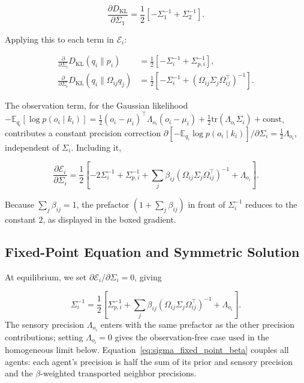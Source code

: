 \begin{equation}
\frac{\partial D_{\mathrm{KL}}}{\partial \Sigma_1}
=\frac{1}{2}\left[
-\Sigma_1^{-1}
+ \Sigma_2^{-1}
\right].
\end{equation}

Applying this to each term in $\mathcal{E}_i$:

\begin{align}
\frac{\partial}{\partial \Sigma_i}
D_{\mathrm{KL}}(q_i \| p_i)
&=\frac{1}{2}\left[
-\Sigma_i^{-1}
+ \Sigma_{p,i}^{-1}
\right],
\\[6pt]
\frac{\partial}{\partial \Sigma_i}
D_{\mathrm{KL}}(q_i \| \Omega_{ij} q_j)
&=
\frac{1}{2}\left[
-\Sigma_i^{-1}
+ (\Omega_{ij}\Sigma_j\Omega_{ij}^\top)^{-1}
\right].
\end{align}

The observation term, for the Gaussian likelihood $-\mathbb{E}_{q_i}[\log p(o_i \mid k_i)] = \tfrac{1}{2}(o_i - \mu_i)^\top \Lambda_{o_i}(o_i - \mu_i) + \tfrac{1}{2}\mathrm{tr}(\Lambda_{o_i}\Sigma_i) + \mathrm{const}$, contributes a constant precision correction $\partial[-\mathbb{E}_{q_i}\log p(o_i \mid k_i)]/\partial\Sigma_i = \tfrac{1}{2}\Lambda_{o_i}$, independent of $\Sigma_i$. Including it,

\begin{equation}
\boxed{
\frac{\partial \mathcal{E}_i}{\partial \Sigma_i}
=\frac{1}{2}
\left[
-2 \Sigma_i^{-1}
+ \Sigma_{p,i}^{-1}
+ \sum_j \beta_{ij}
(\Omega_{ij}\Sigma_j\Omega_{ij}^\top)^{-1}
+ \Lambda_{o_i}
\right].
}
\end{equation}

Because $\sum_j \beta_{ij} = 1$, the prefactor $(1 + \sum_j \beta_{ij})$ in front of $\Sigma_i^{-1}$ reduces to the constant $2$, as displayed in the boxed gradient.

\subsection{Fixed-Point Equation and Symmetric Solution}

At equilibrium, we set $\partial \mathcal{E}_i / \partial \Sigma_i = 0$, giving

\begin{equation}
\Sigma_i^{-1}
=\frac{1}{2}
\left[
\Sigma_{p,i}^{-1}
+ \sum_j \beta_{ij}
(\Omega_{ij}\Sigma_j\Omega_{ij}^\top)^{-1}
+ \Lambda_{o_i}
\right].
\label{eq:sigma_fixed_point_beta}
\end{equation}
The sensory precision $\Lambda_{o_i}$ enters with the same prefactor as the other precision contributions; setting $\Lambda_{o_i} = 0$ gives the observation-free case used in the homogeneous limit below. Equation~\eqref{eq:sigma_fixed_point_beta} couples all agents: each agent's precision is half the sum of its prior and sensory precision and the $\beta$-weighted transported neighbor precisions.

